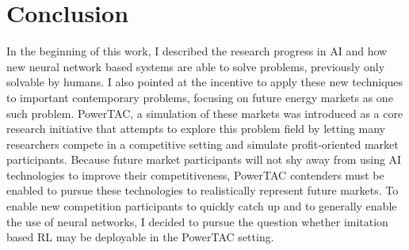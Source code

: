 %
%
%
%
%
%
%
%

\chapter{Conclusion}%
\label{cha:conclusion}

In the beginning of this work, I described the research progress in \ac{AI} and how new neural network based
systems are able to solve problems, previously only solvable by humans. I also pointed at the incentive to
apply these new techniques to important contemporary problems, focusing on future energy markets as one such problem.
\ac{PowerTAC}, a simulation of these markets was introduced as a core research initiative that attempts to explore this
problem field by letting many researchers compete in a competitive setting and simulate profit-oriented market
participants. Because future market participants will not shy away from using \ac{AI} technologies to improve their
competitiveness, \ac{PowerTAC} contenders must be enabled to pursue these technologies to realistically represent
future markets. To enable new competition participants to quickly catch up and to generally enable the use of neural
networks, I decided to pursue the question whether imitation based \ac{RL} may be deployable in the \ac{PowerTAC}
setting.

